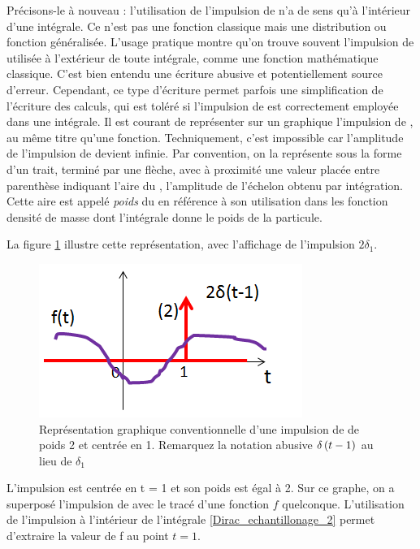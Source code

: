 \begin{remark}{}
	Précisons-le à nouveau : l'utilisation de l'impulsion de
        \Dirac{} n'a de sens qu'à l'intérieur d'une intégrale. Ce n'est
        pas une fonction classique mais une distribution ou fonction
        généralisée. L'usage pratique montre qu'on trouve souvent
        l'impulsion de \Dirac{} utilisée à l'extérieur de toute
        intégrale, comme une fonction mathématique classique. C'est
        bien entendu une écriture abusive et potentiellement source
        d'erreur. Cependant, ce type d'écriture permet parfois une
        simplification de l'écriture des calculs, qui est toléré si
        l'impulsion de \Dirac{} est correctement employée dans une
        intégrale. Il est courant de représenter sur un graphique
        l'impulsion de \Dirac, au même titre qu'une
        fonction. Techniquement, c'est impossible car l'amplitude de
        l'impulsion de \Dirac{} devient infinie. Par convention, on la
        représente sous la forme d'un trait, terminé par une flèche,
        avec à proximité une valeur placée entre parenthèse indiquant
        l'aire du \Dirac, \cad{} l'amplitude de l'échelon obtenu par
        intégration. Cette aire est appelé \emph{poids} du \Dirac{} en
        référence à son utilisation dans les fonction densité de masse
        dont l'intégrale donne le poids de la particule.

        La figure \ref{fig:representation_dirac} illustre cette
        représentation, avec l'affichage de l'impulsion
        $2\delta_1$.
        \begin{figure}[htbp]
          \centering
          \includegraphics[scale=0.6]{images/representation_Dirac.png}
          \caption{Représentation graphique conventionnelle d'une
            impulsion de \Dirac de poids 2 et centrée en 1. Remarquez
            la notation abusive $\delta\left(t-1\right)$ au lieu de $\delta_1$}
          \label{fig:representation_dirac}
	\end{figure}
L'impulsion est centrée en t = 1 et son poids
        est égal à 2. Sur ce graphe, on a superposé l'impulsion de
        \Dirac{} avec le tracé d'une fonction $f$
        quelconque. L'utilisation de l'impulsion à l'intérieur de
        l'intégrale \ref{Dirac_echantillonage_2} permet d'extraire la
        valeur de f au point $t = 1$.



\end{remark}
